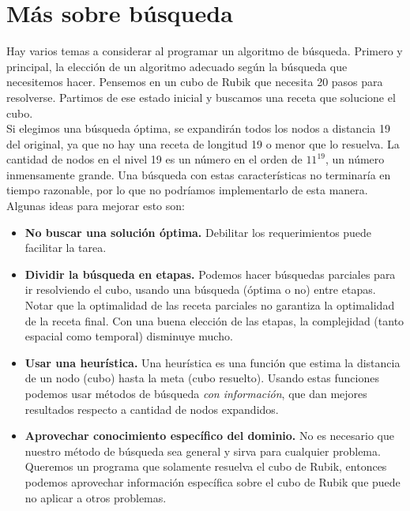 \documentclass[11pt,a4paper]{article}
\begin{document}
\section{Más sobre búsqueda}
Hay varios temas a considerar al programar un algoritmo de búsqueda. Primero y principal, la elección de un algoritmo adecuado según la búsqueda que necesitemos hacer. Pensemos en un cubo de Rubik que necesita 20 pasos para resolverse. Partimos de ese estado inicial y buscamos una receta que solucione el cubo. \\

Si elegimos una búsqueda óptima, se expandirán todos los nodos a distancia 19 del original, ya que no hay una receta de longitud 19 o menor que lo resuelva\footnotemark. La cantidad de nodos en el nivel 19 es un número en el orden de $11^{19}$, un número inmensamente grande. Una búsqueda con estas características no terminaría en tiempo razonable, por lo que no podríamos implementarlo de esta manera. Algunas ideas para mejorar esto son:


\begin{itemize}
\item \textbf{No buscar una solución óptima.} Debilitar los requerimientos puede facilitar la tarea. 
\item \textbf{Dividir la búsqueda en etapas.} Podemos hacer búsquedas parciales para ir resolviendo el cubo, usando una búsqueda (óptima o no) entre etapas. Notar que la optimalidad de las receta parciales no garantiza la optimalidad de la receta final.
Con una buena elección de las etapas, la complejidad (tanto espacial como temporal) disminuye mucho.
\item \textbf{Usar una heurística.} Una heurística es una función que estima la distancia de un nodo (cubo) hasta la meta (cubo resuelto). Usando estas funciones podemos usar métodos de búsqueda \emph{con información}, que dan mejores resultados respecto a cantidad de nodos expandidos.
\item \textbf{Aprovechar conocimiento específico del dominio.} %
No es necesario que nuestro método de búsqueda sea general y sirva para cualquier problema. Queremos un programa que solamente resuelva el cubo de Rubik, entonces podemos aprovechar información específica sobre el cubo de Rubik que puede no aplicar a otros problemas.
\end{itemize}
\end{document}

